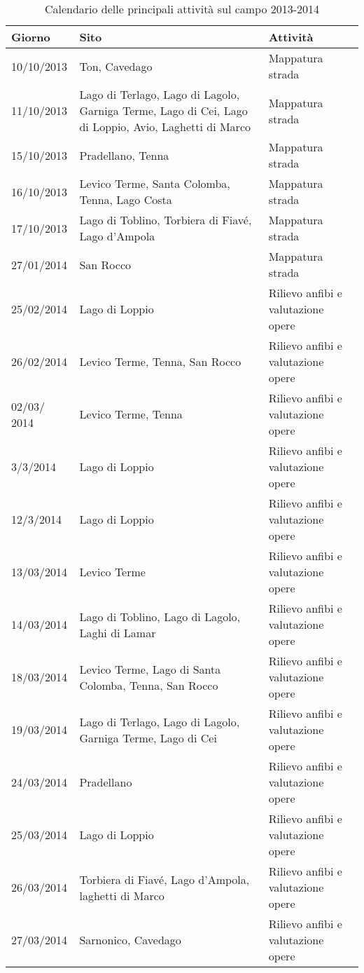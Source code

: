 \documentclass[11pt,a4paper,twoside]{memoir}
\begin{document}
\begin{table}[H]
\centering
\label{tab:impegno}
  \begin{tabular}{lp{}l}
  \toprule            
    \textbf{Giorno} & \textbf{Sito} & \textbf{Attività} \\
  \midrule            
      10/10/2013  & Ton, Cavedago & Mappatura strada  \\
      11/10/2013  & Lago di Terlago, Lago di Lagolo, Garniga Terme, Lago di Cei, Lago di Loppio, Avio, Laghetti di Marco  & Mappatura strada  \\
      15/10/2013  & Pradellano, Tenna & Mappatura strada  \\
      16/10/2013  & Levico Terme, Santa Colomba, Tenna, Lago Costa  & Mappatura strada  \\
      17/10/2013  & Lago di Toblino, Torbiera di Fiavé, Lago d'Ampola & Mappatura strada  \\
      27/01/2014  & San Rocco & Mappatura strada  \\
      25/02/2014  & Lago di Loppio  & Rilievo anfibi e valutazione opere  \\
      26/02/2014  & Levico Terme, Tenna, San Rocco  & Rilievo anfibi e valutazione opere  \\
      02/03/ 2014 & Levico Terme, Tenna & Rilievo anfibi e valutazione opere  \\
      3/3/2014  & Lago di Loppio  & Rilievo anfibi e valutazione opere  \\
      12/3/2014 & Lago di Loppio  & Rilievo anfibi e valutazione opere  \\
      13/03/2014  & Levico Terme  & Rilievo anfibi e valutazione opere  \\
      14/03/2014  & Lago di Toblino, Lago di Lagolo, Laghi di Lamar & Rilievo anfibi e valutazione opere  \\
      18/03/2014  & Levico Terme, Lago di Santa Colomba, Tenna, San Rocco & Rilievo anfibi e valutazione opere  \\
      19/03/2014  & Lago di Terlago, Lago di Lagolo, Garniga Terme, Lago di Cei & Rilievo anfibi e valutazione opere  \\
      24/03/2014  & Pradellano  & Rilievo anfibi e valutazione opere  \\
      25/03/2014  & Lago di Loppio  & Rilievo anfibi e valutazione opere  \\
      26/03/2014  & Torbiera di Fiavé, Lago d'Ampola, laghetti di Marco & Rilievo anfibi e valutazione opere  \\
      27/03/2014  & Sarnonico, Cavedago & Rilievo anfibi e valutazione opere  \\
  \bottomrule           
  \end{tabular}
\caption{Calendario delle principali attività sul campo 2013-2014}
\end{table}
\end{document}
